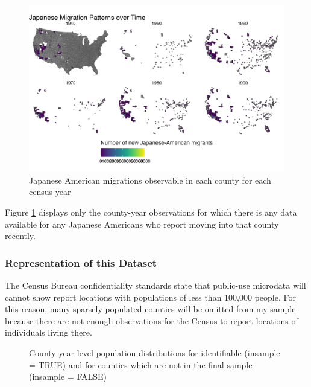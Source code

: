 \documentclass[12pt]{article}
\begin{document}
\begin{figure}[!h]
    \centering
    \includegraphics[width=0.8\linewidth]{figures/migrationmap.png}
    \caption{Japanese American migrations observable in each county for each census year}
    \label{fig:migrationmap}
\end{figure}

Figure \ref{fig:migrationmap} displays only the county-year observations for which there is any data available for any Japanese Americans who report moving into that county recently. 

\subsubsection{Representation of this Dataset}

The Census Bureau confidentiality standards state that public-use
microdata will cannot show report locations with populations of less
than 100,000 people. For this reason, many sparsely-populated counties
will be omitted from my sample because there are not enough observations
for the Census to report locations of individuals living there.


\label{cell-fig-comparesamplepops}
\begin{figure}[H]
\caption{\label{fig-comparesamplepops}County-year level population
distributions for identifiable (insample = TRUE) and for counties which are not in the final sample (insample = FALSE)}
\end{figure}%
\end{document}
